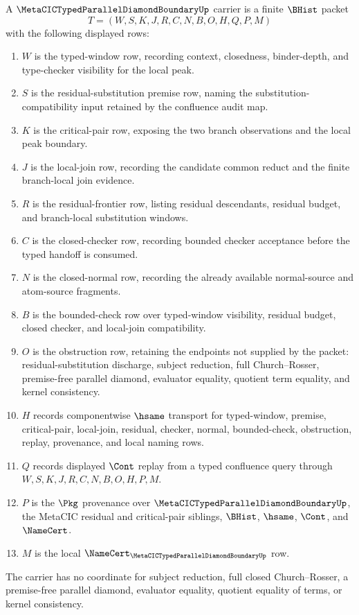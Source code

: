 \begin{definition}
\label{def:metacic-typed-parallel-diamond-boundary-carrier}
A $\MetaCICTypedParallelDiamondBoundaryUp$ carrier is a finite $\BHist$ packet
$$
T=(W,S,K,J,R,C,N,B,O,H,Q,P,M)
$$
with the following displayed rows:
\begin{enumerate}
\item $W$ is the typed-window row, recording context, closedness, binder-depth, and type-checker visibility for the local peak.
\item $S$ is the residual-substitution premise row, naming the substitution-compatibility input retained by the confluence audit map.
\item $K$ is the critical-pair row, exposing the two branch observations and the local peak boundary.
\item $J$ is the local-join row, recording the candidate common reduct and the finite branch-local join evidence.
\item $R$ is the residual-frontier row, listing residual descendants, residual budget, and branch-local substitution windows.
\item $C$ is the closed-checker row, recording bounded checker acceptance before the typed handoff is consumed.
\item $N$ is the closed-normal row, recording the already available normal-source and atom-source fragments.
\item $B$ is the bounded-check row over typed-window visibility, residual budget, closed checker, and local-join compatibility.
\item $O$ is the obstruction row, retaining the endpoints not supplied by the packet: residual-substitution discharge, subject reduction, full Church--Rosser, premise-free parallel diamond, evaluator equality, quotient term equality, and kernel consistency.
\item $H$ records componentwise $\hsame$ transport for typed-window, premise, critical-pair, local-join, residual, checker, normal, bounded-check, obstruction, replay, provenance, and local naming rows.
\item $Q$ records displayed $\Cont$ replay from a typed confluence query through $W,S,K,J,R,C,N,B,O,H,P,M$.
\item $P$ is the $\Pkg$ provenance over $\MetaCICTypedParallelDiamondBoundaryUp$, the MetaCIC residual and critical-pair siblings, $\BHist$, $\hsame$, $\Cont$, and $\NameCert$.
\item $M$ is the local $\NameCert_{\MetaCICTypedParallelDiamondBoundaryUp}$ row.
\end{enumerate}
The carrier has no coordinate for subject reduction, full closed Church--Rosser, a premise-free parallel diamond, evaluator equality, quotient equality of terms, or kernel consistency.
\end{definition}

